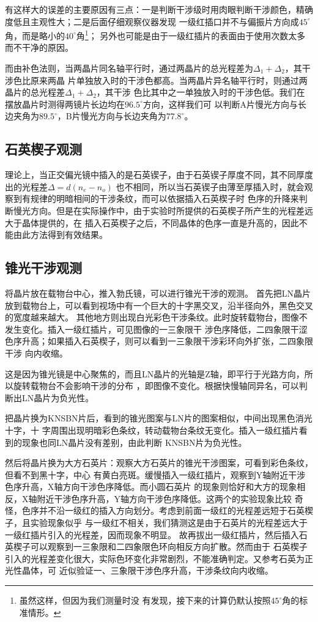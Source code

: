 \documentclass[11pt,a4paper]{article}
\begin{document}
\begin{spacing}{1.3}
\begin{CJK*}{UTF8}{gbsn}
有这样大的误差的主要原因有三点：一是判断干涉级时用肉眼判断干涉颜色，精确度低且主观性大；二是后面仔细观察仪器发现
一级红插口并不与偏振片方向成$45^{\circ}$角，而是略小的$40^{\circ}$角\footnote{虽然这样，但因为我们测量时没
有发现，接下来的计算仍默认按照$45^{\circ}$角的标准情形。}；
另外也可能是由于一级红插片的表面由于使用次数太多而不干净的原因。\par 
而由补色法则，当两晶片同名轴平行时，通过两晶片的总光程差为$\Delta_1+\Delta_2$，其干涉色比原来两晶
片单独放入时的干涉色都高。当两晶片异名轴平行时，则通过两晶片的总光程差$\Delta_1+\Delta_2$，其干涉
色比其中之一单独放入时的干涉色低。我们在摆放晶片时测得两镜片长边均在$96.5^{\circ}$方向，这样我们可
以判断A片慢光方向与长边夹角为$89.5^{\circ}$，B片慢光方向与长边夹角为$77.8^{\circ}$。

\subsection{石英楔子观测}
理论上，当正交偏光镜中插入的是石英锲子，由于石英锲子厚度不同，其不同厚度出的光程差$\Delta=d(n_e-n_o)$
也不相同，所以当石英锲子由薄至厚插入时，就会观察到有规律的明暗相间的干涉条纹，而可以依据插入石英楔子时
色序的升降来判断慢光方向。但是在实际操作中，由于实验时所提供的石英楔子所产生的光程差远大于晶体提供的，在
插入石英楔子之后，不同晶体的色序一直是升高的，因此不能由此方法得到有效结果。

\subsection{锥光干涉观测}
将晶片放在载物台中心，推入勃氏镜，可以进行锥光干涉的观测。
首先把LN晶片放到载物台上，可以看到视场中有一个巨大的十字黑交叉，沿半径向外，黑色交叉的宽度越来越大。
其他地方则出现白光彩色干涉条纹。此时旋转载物台，图像不发生变化。插入一级红插片，可见图像的一三象限干
涉色序降低，二四象限干涩色序升高；如果插入石英楔子，则可以看到一三象限干涉彩环向外扩张，二四象限干涉
向内收缩。\par 
这是因为锥光镜是中心聚焦的，而且LN晶片的光轴是Z轴，即平行于光路方向，所以旋转载物台不会影响干涉的分布
，即图像不变化。根据快慢轴同异名，可以判断出LN晶片为负光性。\par 
把晶片换为KNSBN片后，看到的锥光图案与LN片的图案相似，中间出现黑色消光十字，十
字周围出现明暗彩色条纹，转动载物台条纹无变化。插入一级红插片看到的现象也同LN晶片没有差别，由此判断
KNSBN片为负光性。\par 
然后将晶片换为大方石英片：观察大方石英片的锥光干涉图案，可看到彩色条纹，但看不到黑十字，中心
有黄白亮斑。缓慢插入一级红插片，观察到Y轴附近干涉色序升高，X轴方向干涉色序降低。而小圆石英片
的现象则恰好和大方的现象相反，X轴附近干涉色序升高，Y轴方向干涉色序降低。这两个的实验现象比较
奇怪，色序并不沿一级红的插入方向划分。考虑到前面一级红的光程差远短于石英楔子，且实验现象似乎
与一级红不相关，我们猜测这是由于石英片的光程差远大于一级红插片引入的光程差，因而现象不明显。
故再拔出一级红插片，然后插入石英楔子可以观察到一三象限和二四象限色环向相反方向扩散。然而由于
石英楔子引入的光程差变化很大，实际色环变化非常剧烈，不能准确判定。又参考石英为正光性晶体，可
近似验证一、三象限干涉色序升高，干涉条纹向内收缩。


\end{CJK*}
\end{spacing}
\end{document}
